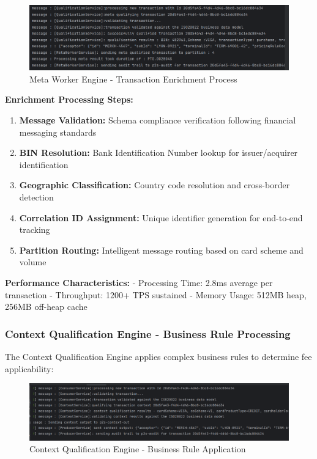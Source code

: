 \begin{figure}[h]
    \centering
    \includegraphics[width=1\textwidth]{img/impl/meta qualif.png}
    \caption{Meta Worker Engine - Transaction Enrichment Process}
    \label{fig:processing-flow-meta}
\end{figure}

\textbf{Enrichment Processing Steps:}
\begin{enumerate}
    \item \textbf{Message Validation:} Schema compliance verification following financial messaging standards
    \item \textbf{BIN Resolution:} Bank Identification Number lookup for issuer/acquirer identification
    \item \textbf{Geographic Classification:} Country code resolution and cross-border detection
    \item \textbf{Correlation ID Assignment:} Unique identifier generation for end-to-end tracking
    \item \textbf{Partition Routing:} Intelligent message routing based on card scheme and volume
\end{enumerate}

\textbf{Performance Characteristics:}
- Processing Time: 2.8ms average per transaction
- Throughput: 1200+ TPS sustained
- Memory Usage: 512MB heap, 256MB off-heap cache

\subsubsection{Context Qualification Engine - Business Rule Processing}

The Context Qualification Engine applies complex business rules to determine fee applicability:

\begin{figure}[h]
    \centering
    \includegraphics[width=1\textwidth]{img/impl/context.png}
    \caption{Context Qualification Engine - Business Rule Application}
    \label{fig:processing-flow-context}
\end{figure}

